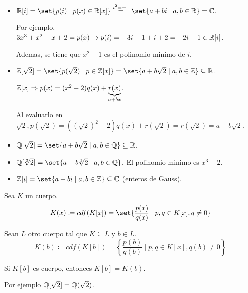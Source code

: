 \begin{example}
	\begin{itemize}
		\item \(\R[i] = \set{p(i) \mid p(x) \in \R[x]} \overset{i^{2} = -1 }{=} \set{a + bi \mid a,b \in \R} = \C \).
		      
		      Por ejemplo, \(3x^{3} + x^{2} + x + 2 = p(x) \rightarrow p(i) = -3 i - 1 + i + 2 = -2i + 1 \in \mathbb{R}[i] \).
		      
		      Ademas, se tiene que \(x^{2} + 1 \) es el polinomio minimo de \(i \).
		\item \(\Z[\sqrt{2} ] = \set{p(\sqrt{2} ) \mid p \in \Z[x]} = \set{a + b\sqrt{2} \mid a,b \in \Z } \subseteq \R \).
		      
		      \(\mathbb{Z}[x] \Rightarrow p(x) = (x^{2} - 2 )q(x) + \underbrace{r(x)}_{a + bx}\).
		      
		      Al evaluarlo en \(\sqrt{2}, p(\sqrt{2} ) = ((\sqrt{2} )^{2} - 2 )q(x) + r(\sqrt{2} ) = r(\sqrt{2} ) = a + b\sqrt{2} \).
		\item \(\Q[\sqrt{2} ] = \set{a + b\sqrt{2} \mid a,b \in \Q}\subseteq \R \).
		\item \(\Q[\sqrt[3]{2} ] = \set{a + b \sqrt[3]{2}\mid a,b \in \Q }\). El polinomio minimo es \(x^{3} - 2  \).
		      
		\item \(\Z[i] = \set{a + bi \mid a,b \in \Z} \subseteq \C \) (enteros de Gauss).
		      
		      
	\end{itemize}
\end{example}
\begin{definition}
	Sea \(K \) un cuerpo.
	\[
		K(x) \coloneqq cdf(K[x]) = \set{\frac{p(x)}{q(x)} \mid p,q \in K[x ], q \neq 0 }
	\]
\end{definition}
\begin{definition}
	Sean \(L \) otro cuerpo tal que \(K \subseteq L \) y \(  b \in L\).
	\[
		K(b) \coloneqq cdf(K[b]) = \left\{ \frac{p(b)}{q(b) }\mid p,q \in K[x], q(b) \neq 0\right\}
	\]
\end{definition}
\begin{remark}
	Si \(K[b ]\) es cuerpo, entonces \(K[b] = K(b )\).
	
	Por ejemplo \(\mathbb{Q}[\sqrt{2} ] = \mathbb{Q}(\sqrt{2} )\).
\end{remark}

